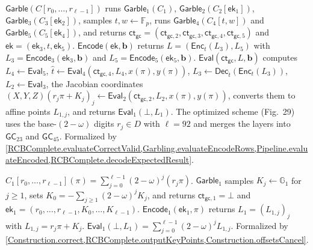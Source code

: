\begin{paperconstr}\label{babe:fig21}
$\mathsf{Garble}(C[r_0, \ldots, r_{\ell-1}])$ runs $\mathsf{Garble}_1(C_1)$, $\mathsf{Garble}_2(C_2[\mathsf{ek}_1])$, $\mathsf{Garble}_3(C_3[\mathsf{ek}_2])$, samples $t, w \gets \mathbb{F}_p$, runs $\mathsf{Garble}_4(C_4[t, w])$ and $\mathsf{Garble}_5(C_5[\mathsf{ek}_4])$, and returns $\mathsf{ct}_{\mathsf{gc}} = (\mathsf{ct}_{\mathsf{gc},2}, \mathsf{ct}_{\mathsf{gc},3}, \mathsf{ct}_{\mathsf{gc},4}, \mathsf{ct}_{\mathsf{gc},5})$ and $\mathsf{ek} = (\mathsf{ek}_3, t, \mathsf{ek}_5)$.
$\mathsf{Encode}(\mathsf{ek}, \mathbf{b})$ returns $L = (\mathsf{Enc}_t(L_3), L_5)$ with $L_3 = \mathsf{Encode}_3(\mathsf{ek}_3, \mathbf{b})$ and $L_5 = \mathsf{Encode}_5(\mathsf{ek}_5, \mathbf{b})$.
$\mathsf{Eval}(\mathsf{ct}_{\mathsf{gc}}, L, \mathbf{b})$ computes $L_4 \gets \mathsf{Eval}_5$, $\hat t \gets \mathsf{Eval}_4(\mathsf{ct}_{\mathsf{gc},4}, L_4, x(\pi), y(\pi))$, $L_3 \gets \mathsf{Dec}_{\hat t}(\mathsf{Enc}_t(L_3))$, $L_2 \gets \mathsf{Eval}_3$, the Jacobian coordinates $(X, Y, Z)(r_j \pi + K_j)_{j} \gets \mathsf{Eval}_2(\mathsf{ct}_{\mathsf{gc},2}, L_2, x(\pi), y(\pi))$, converts them to affine points $L_{1,j}$, and returns $\mathsf{Eval}_1(\bot, L_1)$.
The optimized scheme (Fig.~29) uses the base-$(2-\omega)$ digits $r_j \in D$ with $\ell = 92$ and merges the layers into $\mathsf{GC}_{23}$ and $\mathsf{GC}_{45}$.
Formalized by \cref{RCBComplete.evaluateCorrectValid,Garbling.evaluateEncodeRows,Pipeline.evaluateEncoded,RCBComplete.decodeExpectedResult}.
\end{paperconstr}

\begin{paperconstr}\label{babe:fig7}
$C_1[r_0, \ldots, r_{\ell-1}](\pi) = \sum_{j=0}^{\ell-1} (2-\omega)^j (r_j \pi)$.
$\mathsf{Garble}_1$ samples $K_j \gets \mathbb{G}_1$ for $j \geq 1$, sets $K_0 = -\sum_{j \geq 1} (2-\omega)^j K_j$, and returns $\mathsf{ct}_{\mathsf{gc},1} = \bot$ and $\mathsf{ek}_1 = (r_0, \ldots, r_{\ell-1}, K_0, \ldots, K_{\ell-1})$.
$\mathsf{Encode}_1(\mathsf{ek}_1, \pi)$ returns $L_1 = (L_{1,j})_j$ with $L_{1,j} = r_j \pi + K_j$.
$\mathsf{Eval}_1(\bot, L_1) = \sum_{j=0}^{\ell-1} (2-\omega)^j L_{1,j}$.
Formalized by \cref{Construction.correct,RCBComplete.outputKeyPoints,Construction.offsetsCancel}.
\end{paperconstr}

